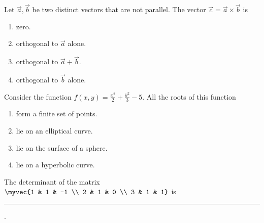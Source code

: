     \item Let $\vec{a}, \vec{b}$ be two distinct vectors that are not parallel. The vector $\vec{c}=\vec{a}\times\vec{b}$ is
    \hfill{}
    \begin{multicols}{2}
    \begin{enumerate}
        \item zero.
        \item orthogonal to $\vec{a}$ alone.
        \item orthogonal to $\vec{a}+\vec{b}$.
        \item orthogonal to $\vec{b}$ alone.
    \end{enumerate}
    \end{multicols}
    \item Consider the function $f(x,y)=\frac{x^{2}}{2}+\frac{y^{2}}{3}-5$. All the roots of this function
    \hfill{}
    \begin{multicols}{2}
    \begin{enumerate}
        \item form a finite set of points.
        \item lie on an elliptical curve.
        \item lie on the surface of a sphere.
        \item lie on a hyperbolic curve.
    \end{enumerate}
    \end{multicols}
    \item The determinant of the matrix $\myvec{1 & 1 & -1 \\ 2 & 1 & 0 \\ 3 & 1 & 1}$ is \rule{1cm}{0.01pt}.
    \hfill{}

